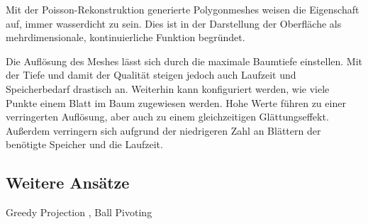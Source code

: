 Mit der Poisson-Rekonstruktion generierte Polygonmeshes weisen die Eigenschaft auf, immer wasserdicht zu sein.
Dies ist in der Darstellung der Oberfläche als mehrdimensionale, kontinuierliche Funktion begründet.

Die Auflösung des Meshes lässt sich durch die maximale Baumtiefe einstellen.
Mit der Tiefe und damit der Qualität steigen jedoch auch Laufzeit und Speicherbedarf drastisch an.
Weiterhin kann konfiguriert werden, wie viele Punkte einem Blatt im Baum zugewiesen werden.
Hohe Werte führen zu einer verringerten Auflösung, aber auch zu einem gleichzeitigen Glättungseffekt.
Außerdem verringern sich aufgrund der niedrigeren Zahl an Blättern der benötigte Speicher und die Laufzeit.


\subsection{Weitere Ansätze}
\label{subsec:triangulation-others}
Greedy Projection \cite{Marton09ICRA},
Ball Pivoting \cite{bernardini1999ball}
